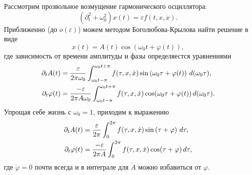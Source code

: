 
Рассмотрим прозвольное возмущение гармонического осциллятора:
\begin{equation}
    \left(\partial_t^2 + \omega_0^2\right) x(t) = \varepsilon f(t, x, \dot{x}).
    \label{sloweq}
\end{equation}
Приближенно (до $o(\varepsilon)$) можем методом Боголюбова-Крылова найти
решение в виде
\begin{equation}
    x(t) = A(t) \cos(\omega_0 t + \varphi(t)),
    \label{sloweqview}
\end{equation}
где зависимость от времени амплитуды и фазы определяестся уравнениями
\begin{align}
    \partial_t A(t) &= \frac{\varepsilon}{2\pi \omega_0}\int_{\omega_0 t-\pi}^{\omega_0 t+\pi} f(\tau, x, \dot{x}) \sin\left(\omega_0 \tau + \varphi(t)\right) \, d (\omega_0\tau), 
    \label{slowA}
    \\
    \partial_t \varphi(t) &= \frac{-\varepsilon}{2 \pi A \omega_0} \int_{\omega_0 t-\pi}^{\omega_0 t + \pi} f(\tau, x, \dot{x}) \cos(\omega_0 \tau + \varphi(t)) \, d (\omega_0 \tau).
    \label{slowphi}
\end{align}
Упрощая себе жизнь с $\omega_0 = 1$, приходим к выражению
\begin{align*}
    \partial_t A(t) &= \frac{\varepsilon}{2\pi }\int_{0}^{2\pi} f(\tau, x, \dot{x}) \sin\left( \tau + \varphi\right) \, d \tau, \\
    \partial_t \varphi(t) &= \frac{-\varepsilon}{2 \pi A } \int_{0}^{2 \pi} f(\tau, x, \dot{x}) \cos( \tau + \varphi) \, d \tau,
\end{align*}
где $\dot{\varphi} = 0$ почти всегда и в интеграле для $\dot{A}$ можно избавиться от $\varphi$. 